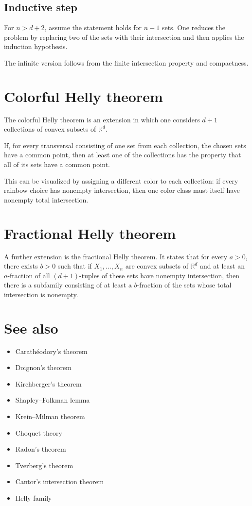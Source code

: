 \documentclass[11pt]{article}
\begin{document}
\subsection*{Inductive step}

For $n > d+2$, assume the statement holds for $n-1$ sets. One reduces the problem by replacing two of the sets with their intersection and then applies the induction hypothesis.

The infinite version follows from the finite intersection property and compactness.

\section*{Colorful Helly theorem}

The colorful Helly theorem is an extension in which one considers $d+1$ collections of convex subsets of $\mathbb{R}^d$.

If, for every transversal consisting of one set from each collection, the chosen sets have a common point, then at least one of the collections has the property that all of its sets have a common point.

This can be visualized by assigning a different color to each collection: if every rainbow choice has nonempty intersection, then one color class must itself have nonempty total intersection.

\section*{Fractional Helly theorem}

A further extension is the fractional Helly theorem. It states that for every $a > 0$, there exists $b > 0$ such that if $X_1, \dots, X_n$ are convex subsets of $\mathbb{R}^d$ and at least an $a$-fraction of all $(d+1)$-tuples of these sets have nonempty intersection, then there is a subfamily consisting of at least a $b$-fraction of the sets whose total intersection is nonempty.

\section*{See also}

\begin{itemize}
    \item Carath\'eodory's theorem
    \item Doignon's theorem
    \item Kirchberger's theorem
    \item Shapley--Folkman lemma
    \item Krein--Milman theorem
    \item Choquet theory
    \item Radon's theorem
    \item Tverberg's theorem
    \item Cantor's intersection theorem
    \item Helly family
\end{itemize}
\end{document}
